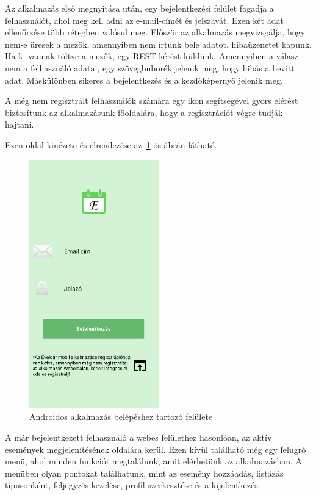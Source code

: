 \documentclass[
]{thesis-ekf}
\theoremstyle{definition}
\theoremstyle{remark}
\begin{document}
	Az alkalmazás első megnyitása után, egy bejelentkezési felület fogadja a felhasználót, ahol meg kell adni az e-mail-címét és jelszavát. Ezen két adat ellenőrzése több rétegben valósul meg. Először az alkalmazás megvizsgálja, hogy nem-e üresek a mezők, amennyiben nem írtunk bele adatot, hibaüzenetet kapunk. Ha ki vannak töltve a mezők, egy REST kérést küldünk. Amennyiben a válasz nem a felhasználó adatai, egy szövegbuborék jelenik meg, hogy hibás a bevitt adat. Máskülönben sikeres a bejelentkezés és a kezdőképernyő jelenik meg.
	
	A még nem regisztrált felhasználók számára egy ikon segítségével gyors elérést biztosítunk az alkalmazásunk főoldalára, hogy a regisztrációt végre tudják hajtani.
	
	Ezen oldal kinézete és elrendezése az~\ref{figure:androidapp_main}-ös ábrán látható.
	
	\begin{figure}[ht!]
		\centering
		\includegraphics[width=0.5\textwidth]{android_app/android_main}
		\caption{Androidos alkalmazás belépéshez tartozó felülete}
		\label{figure:androidapp_main}
	\end{figure}
	
	A már bejelentkezett felhasználó a webes felülethez hasonlóan, az aktív események megjelenítésének oldalára kerül. Ezen kívül található még egy felugró menü, ahol minden funkciót megtalálunk, amit elérhetünk az alkalmazásban. A menüben olyan pontokat találhatunk, mint az esemény hozzáadás, listázás típusonként, feljegyzés kezelése, profil szerkesztése és a kijelentkezés. 
	
\end{document}
